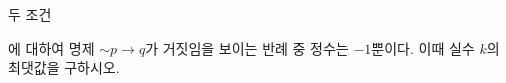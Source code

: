 두 조건\par\smallskip{}\par\smallskip\noindent 에 대하여 명제 ${\sim} p\longrightarrow q$가 거짓임을 보이는 반례 중 정수는 $-1$뿐이다. 이때 실수 $k$의 최댓값을 구하시오. 
